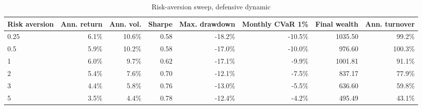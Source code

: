 \begin{table}[!htbp]
\centering
\caption{Risk-aversion sweep, defensive dynamic}
\label{tab:allocation-risk-aversion-defensive}
\small
\setlength{\tabcolsep}{5pt}
\renewcommand{\arraystretch}{1.12}
\begin{adjustbox}{center,max width=\linewidth}
\begin{tabular}{lrrrrrrr}
\toprule
Risk aversion & Ann. return & Ann. vol. & Sharpe & Max. drawdown & Monthly CVaR 1\% & Final wealth & Ann. turnover \\
\midrule
0.25 & 6.1\% & 10.6\% & 0.58 & -18.2\% & -10.5\% & 1035.50 & 99.2\% \\
0.5 & 5.9\% & 10.2\% & 0.58 & -17.0\% & -10.0\% & 976.60 & 100.3\% \\
1 & 6.0\% & 9.7\% & 0.62 & -17.1\% & -9.9\% & 1001.81 & 91.1\% \\
2 & 5.4\% & 7.6\% & 0.70 & -12.1\% & -7.5\% & 837.17 & 77.9\% \\
3 & 4.4\% & 5.8\% & 0.76 & -13.0\% & -5.5\% & 636.60 & 59.8\% \\
5 & 3.5\% & 4.4\% & 0.78 & -12.4\% & -4.2\% & 495.49 & 43.1\% \\
\bottomrule
\end{tabular}
\end{adjustbox}
\end{table}